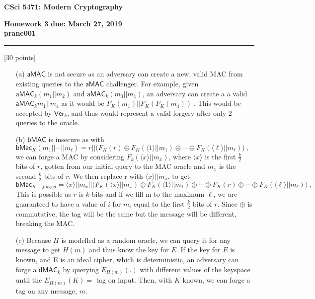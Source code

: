 \documentclass[11pt]{article}
\newcounter{qnum}
\newcommand{\question}[1]{\stepcounter{qnum}\bigskip\noindent{\bf \arabic{qnum}. #1.}}
\newcommand\NetIDa{prane001}
\begin{document}
\begin{center}
{\Large \bf CSci 5471: Modern Cryptography}
\end{center}
{\bf Homework 3} \hfill {\bf due: March 27, 2019}
\medskip
\\
{\bf \NetIDa} \hfill  
\hrule
\medskip
\question{Broken MACs} [30 points]
\begin{itemize}
\item[(a)] $\textsf{aMAC}$  is not secure as an adversary can create a new, valid MAC from
  existing queries to the $\textsf{aMAC}$ challenger. For example, given 
  $\textsf{aMAC}_k(m_1 || m_2)$ and $\textsf{aMAC}_k(m_3 || m_4)$, an adversary can create  a
  a valid $\textsf{aMAC}_k{m_1 || m_4}$ as it would be $ F_K(m_1) ||  F_K(F_K(m_4))\ .$ This 
  would be accepted by $\textsf{Ver}_k$, and thus would represent a valid forgery after only 
  2 queries to the oracle.
\item[(b)] $\textsf{bMAC}$ is insecure as with $\textsf{bMac}_K(m_1 || \cdots ||
  m_\ell) = r || \bigl( F_K(r) \oplus F_K(\langle 1 \rangle || m_1) \oplus
  \cdots \oplus F_K(\langle \ell \rangle || m_\ell) \bigr) \ ,$ we can forge a MAC by 
  considering $F_k(\langle x \rangle || m_x)$, where $\langle x \rangle$ is the first
  $\frac{k}{2}$ bits of $r$, gotten from our initial query to the MAC oracle and $m_x$ is the 
  second $\frac{k}{2}$ bits of $r$. We then replace r with $\langle x \rangle || m_x$, to get
  $$\textsf{bMac}_{K - forged} = \langle x \rangle || m_x || \bigl( F_K(\langle x \rangle || m_x)
    \oplus
    F_K(\langle 1 \rangle || m_1) \oplus \cdots \oplus F_K(r) \oplus \cdots \oplus 
  F_K(\langle \ell \rangle || m_\ell) \bigr) \ ,$$
  This is possible as $r$ is $k$-bits and if we fill m to the maximum $\ell$, we are guaranteed
  to have a value of $i$ for $m_i$ equal to the first $\frac{k}{2}$ bits of $r$. Since $\oplus$ is
  commutative, the tag will be the same but the message will be different, breaking the MAC.

\item[(c)] Because $H$ is modelled as a random oracle, we can query it for any message to
  get $H(m)$ and thus know the key for $E$. If the key for $E$ is known, and E is an
  ideal cipher, which is deterministic, an adversary can forge a $\textsf{dMAC}_k$ by 
querying $E_{H(m)}(.)$ with different values of the keyspace until the $E_{H(m)}(K) =$ 
tag on input. Then, with $K$ known, we can forge a tag on any message, $m$.
\end{itemize}
\end{document}
